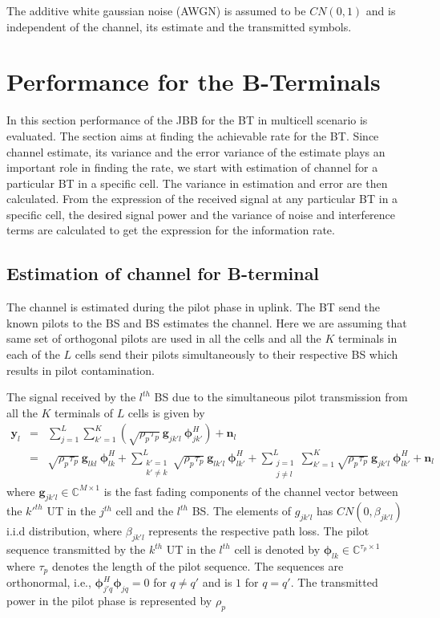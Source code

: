\documentclass[10pt, a4paper, twoside,fleqn]{article}
\begin{document}
The additive white gaussian noise (AWGN) is assumed to be $CN(0,1)$ and is independent of the channel, its estimate and the transmitted symbols.

\section{Performance for the B-Terminals}
	In this section performance of the JBB for the BT in multicell scenario is evaluated. The section aims at finding the achievable rate for the BT. Since channel estimate, its variance and the error variance of the estimate plays an important role in finding the rate, we start with estimation of channel for a particular BT in a specific cell. The variance in estimation and error are then calculated. From the expression of the received signal at any particular BT in a specific cell, the desired signal power and the variance of noise and interference terms are calculated to get the expression for the information rate.

\subsection{Estimation of channel for B-terminal} \label{sec:btchesti}
	The channel is estimated during the pilot phase in uplink. The BT send the known pilots to the BS and BS estimates the channel. Here we are assuming that same set of orthogonal pilots are used in all the cells and all the $K$ terminals in each of the $L$ cells send their pilots simultaneously to their respective BS which results in pilot contamination.

The signal received by the $l^{th}$ BS due to the simultaneous pilot transmission from  all the $K$ terminals of $L$ cells is given by
\begin{eqnarray}\label{eq:rcvy}
	\pmb{y}_{l} &=& \sum_{j=1}^{L} \sum_{k'=1}^{K} \left(\sqrt{\rho_p \tau_p} \ \pmb{g}_{jk'l} \ \pmb{\phi}^H_{jk'}\right)
        		    +  \pmb{n}_{l} \nonumber \\                    
    			   &=& \sqrt{\rho_p \tau_p} \ \pmb{g}_{lkl} \ \pmb{\phi}^H_{lk}
        			+  \sum_{\substack{k'=1 \\ k' \neq k}}^{L} \sqrt{\rho_p \tau_p} \ \pmb{g}_{lk'l} \ \pmb{\phi}^H_{lk'}
        		    +  \sum_{\substack{j=1 \\ j \neq l}}^{L} \sum_{k'=1}^{K} \sqrt{\rho_p \tau_p} \
                       \pmb{g}_{jk'l} \ \pmb{\phi}^H_{lk'}
    			    +  \pmb{n}_{l}
\end{eqnarray}
where $\pmb{g}_{jk'l} \in {\mathbb C}^{M \times 1}$ is the fast fading components of the channel vector between the $k'^{th}$ UT in the $j^{th}$ cell and the $l^{th}$ BS. The elements of $g_{jk'l}$ has $CN(0,\beta_{jk'l})$ i.i.d distribution, where $\beta_{jk'l}$ represents the respective path loss. The pilot sequence transmitted by the $k^{th}$ UT in the $l^{th}$ cell is denoted by $\pmb{\phi}_{lk} \in {\mathbb C}^{\tau_p \times 1}$ where $\tau_p$ denotes the length of the pilot sequence. The sequences are orthonormal, i.e., $\pmb{\phi}_{j'q}^H \pmb{\phi}_{jq} = 0$ for  $q \ne q'$ and is $1$ for $q=q'$. The transmitted power in the pilot phase is represented by $\rho_p$
\end{document}

